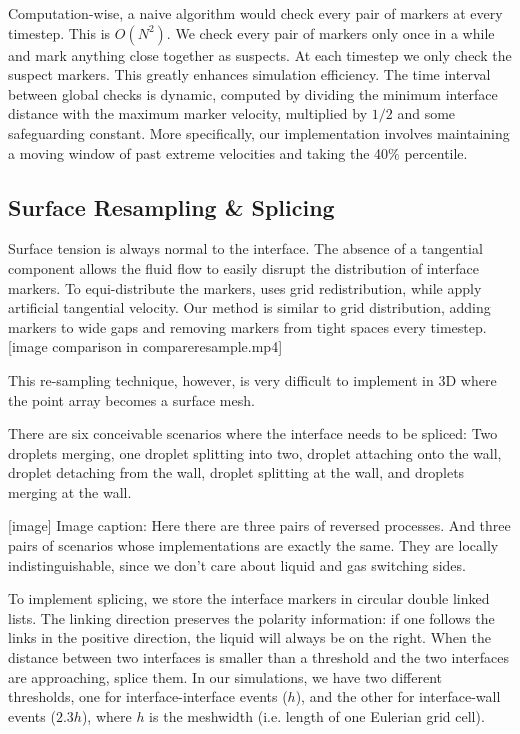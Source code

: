 \documentclass{jfm}
\begin{document}
Computation-wise, a naive algorithm would check every pair of markers at every timestep. This is $O(N^2)$. We check every pair of markers only once in a while and mark anything close together as suspects. At each timestep we only check the suspect markers. This greatly enhances simulation efficiency. The time interval between global checks is dynamic, computed by dividing the minimum interface distance with the maximum marker velocity, multiplied by $1/2$ and some safeguarding constant. More specifically, our implementation involves maintaining a moving window of past extreme velocities and taking the 40\% percentile. 

\subsection{Surface Resampling \& Splicing}\label{sec:results}
Surface tension is always normal to the interface. The absence of a tangential component allows the fluid flow to easily disrupt the distribution of interface markers. To equi-distribute the markers, \cite{lai2008immersed} uses grid redistribution, while \cite{hou1994removing, MCL_IBM_surfactant} apply artificial tangential velocity. Our method is similar to grid distribution, adding markers to wide gaps and removing markers from tight spaces every timestep. 
[image comparison in compareresample.mp4]

This re-sampling technique, however, is very difficult to implement in 3D where the point array becomes a surface mesh.

There are six conceivable scenarios where the interface needs to be spliced: Two droplets merging, one droplet splitting into two, droplet attaching onto the wall, droplet detaching from the wall, droplet splitting at the wall, and droplets merging at the wall. 

[image]
Image caption: Here there are three pairs of reversed processes. And three pairs of scenarios whose implementations are exactly the same. They are locally indistinguishable, since we don't care about liquid and gas switching sides. 

To implement splicing, we store the interface markers in circular double linked lists. The linking direction preserves the polarity information: if one follows the links in the positive direction, the liquid will always be on the right. When the distance between two interfaces is smaller than a threshold and the two interfaces are approaching, splice them. In our simulations, we have two different thresholds, one for interface-interface events ($h$), and the other for interface-wall events ($2.3h$), where $h$ is the meshwidth (i.e. length of one Eulerian grid cell). 
\end{document}
